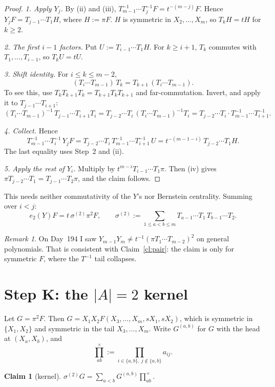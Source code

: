 \documentclass[11pt]{amsart}
\newtheorem{claim}[theorem]{Claim}
\theoremstyle{remark}
\newtheorem*{remark}{Remark}
\newcommand{\cross}{\textstyle\prod^{\times}}
\begin{document}
\begin{proof}
\emph{1. Apply $Y_j$.} By (ii) and (iii), $T_{m-1}^{-1}\cdots T_j^{-1}F = t^{-(m-j)}F$. Hence $Y_jF = T_{j-1}\cdots T_1H$, where $H := \pi F$. $H$ is symmetric in $X_2,\dots,X_m$, so $T_kH = tH$ for $k\ge2$.

\emph{2. The first $i-1$ factors.} Put $U := T_{i-1}\cdots T_1H$. For $k\ge i+1$, $T_k$ commutes with $T_1,\dots,T_{i-1}$, so $T_kU = tU$.

\emph{3. Shift identity.} For $i\le k\le m-2$,
\[
(T_i\cdots T_{m-1})\,T_k = T_{k+1}\,(T_i\cdots T_{m-1}).
\]
To see this, use $T_kT_{k+1}T_k = T_{k+1}T_kT_{k+1}$ and far-commutation. Invert, and apply it to $T_{j-1}\cdots T_{i+1}$:
\[
(T_i\cdots T_{m-1})^{-1}\,T_{j-1}\cdots T_{i+1}T_i = T_{j-2}\cdots T_i\,(T_i\cdots T_{m-1})^{-1}T_i = T_{j-2}\cdots T_i\cdot T_{m-1}^{-1}\cdots T_{i+1}^{-1}.
\]

\emph{4. Collect.} Hence
\[
T_{m-1}^{-1}\cdots T_i^{-1}\,Y_jF = T_{j-2}\cdots T_i\,T_{m-1}^{-1}\cdots T_{i+1}^{-1}\,U = t^{-(m-1-i)}\,T_{j-2}\cdots T_1H.
\]
The last equality uses Step~2 and (ii).

\emph{5. Apply the rest of $Y_i$.} Multiply by $t^{m-i}T_{i-1}\cdots T_1\pi$. Then (iv) gives $\pi T_{j-2}\cdots T_1 = T_{j-1}\cdots T_2\pi$, and the claim follows.
\end{proof}

This needs neither commutativity of the $Y$'s nor Bernstein centrality. Summing over $i<j$:
\[
\boxed{e_2(Y)F = t\,\sigma^{(2)}\pi^2F,}\qquad \sigma^{(2)} := \sum_{1\le a<b\le m}T_{a-1}\cdots T_1\,T_{b-1}\cdots T_2 .
\]

\begin{remark}
On Day~194 I saw $Y_{m-1}Y_m\ne t^{-1}(\pi T_1\cdots T_{m-2})^2$ on general polynomials. That is consistent with Claim~\ref{cl:pair}: the claim is only for symmetric $F$, where the $T^{-1}$ tail collapses.
\end{remark}

\section{Step K: the $|A|=2$ kernel}\label{sec:K}

Let $G = \pi^2F$. Then $G = X_1X_2F(X_3,\dots,X_m,sX_1,sX_2)$, which is symmetric in $\{X_1,X_2\}$ and symmetric in the tail $X_3,\dots,X_m$. Write $G^{(a,b)}$ for $G$ with the head at $(X_a,X_b)$, and
\[
\cross_{ab} := \prod_{i\in\{a,b\},\ j\notin\{a,b\}}a_{ij}.
\]

\begin{claim}[kernel]\label{cl:K}
$\sigma^{(2)}G = \sum_{a<b}G^{(a,b)}\cross_{ab}$.
\end{claim}
\end{document}
